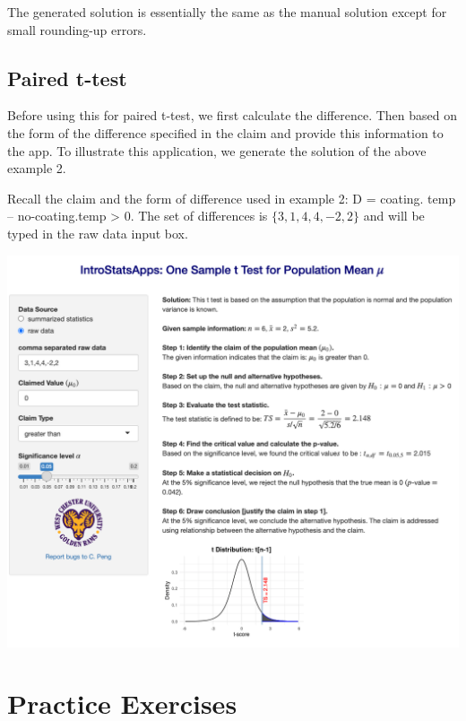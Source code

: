 \documentclass[
]{book}
\begin{document}
The generated solution is essentially the same as the manual solution except for small rounding-up errors.

\hypertarget{paired-t-test}{%
\subsection{Paired t-test}\label{paired-t-test}}

Before using this for paired t-test, we first calculate the difference. Then based on the form of the difference specified in the claim and provide this information to the app. To illustrate this application, we generate the solution of the above example 2.

Recall the claim and the form of difference used in example 2: D = coating. temp -- no-coating.temp \textgreater{} 0. The set of differences is \(\{3, 1, 4, 4, -2, 2 \}\) and will be typed in the raw data input box.

\begin{center}\includegraphics[width=1\linewidth]{week10/techPairedttest} \end{center}

\hfill\break

\hypertarget{practice-exercises-3}{%
\section{Practice Exercises}\label{practice-exercises-3}}
\end{document}
